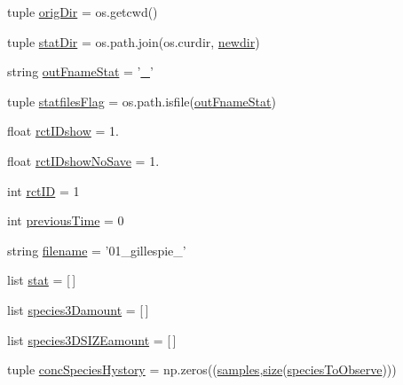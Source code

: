 \begin{DoxyCompactItemize}
\item 
tuple \hyperlink{namespacegeneral_statistics_ae6314a6ebdb4acc22a09fa68ca70565d}{orig\-Dir} = os.\-getcwd()
\item 
tuple \hyperlink{namespacegeneral_statistics_a6267f224190a3e4cc4743c3c3710fe0a}{stat\-Dir} = os.\-path.\-join(os.\-curdir, \hyperlink{namespacegeneral_statistics_a862af869b2c09a9bcb32f2c159d387e8}{newdir})
\item 
string \hyperlink{namespacegeneral_statistics_a3395f09c196abc5195fcdd3d4e04b564}{out\-Fname\-Stat} = '\hyperlink{start_8m_a280c5f85d1264d1df5d06bc5ea8b550c}{\-\_\-}'
\item 
tuple \hyperlink{namespacegeneral_statistics_a54d5cb035107bb188a78056c1f62ef26}{statfiles\-Flag} = os.\-path.\-isfile(\hyperlink{namespacegeneral_statistics_a3395f09c196abc5195fcdd3d4e04b564}{out\-Fname\-Stat})
\item 
float \hyperlink{namespacegeneral_statistics_ad203c6e593d0dda94aa3de01f64438f1}{rct\-I\-Dshow} = 1.
\item 
float \hyperlink{namespacegeneral_statistics_a18f6111b43faa560d8b42f29ec031377}{rct\-I\-Dshow\-No\-Save} = 1.
\item 
int \hyperlink{namespacegeneral_statistics_a1d30aa03b17d083ca247d3fc75d12882}{rct\-I\-D} = 1
\item 
int \hyperlink{namespacegeneral_statistics_af0ac4abd35899cf6efdc0422a6d97c35}{previous\-Time} = 0
\item 
string \hyperlink{namespacegeneral_statistics_a9834b16ec1ee9c5bf0835e87b4c41108}{filename} = '01\-\_\-gillespie\-\_\-'
\item 
list \hyperlink{namespacegeneral_statistics_a2d95f5d313dd8da87f5b5be5b4326a03}{stat} = \mbox{[}$\,$\mbox{]}
\item 
list \hyperlink{namespacegeneral_statistics_a717d9bbd4459fc3d0c6d358cdbdc3287}{species3\-Damount} = \mbox{[}$\,$\mbox{]}
\item 
list \hyperlink{namespacegeneral_statistics_a49505b471d187739723d5212c07a7a0a}{species3\-D\-S\-I\-Z\-Eamount} = \mbox{[}$\,$\mbox{]}
\item 
tuple \hyperlink{namespacegeneral_statistics_a900d9e27b938468e0d244dbb49d7111c}{conc\-Species\-Hystory} = np.\-zeros((\hyperlink{namespacegeneral_statistics_a0f3c6fa133cfbef06ffd82dfbef8ace4}{samples},\hyperlink{crea__e__controlla__i__catalizzatori_8m_ae113ea7f9e515a12ac4b5595c6faf61e}{size}(\hyperlink{namespacegeneral_statistics_acfada06fea0c10e3f1eea8b9cdde37e3}{species\-To\-Observe})))
\item 

\end{DoxyCompactItemize}
